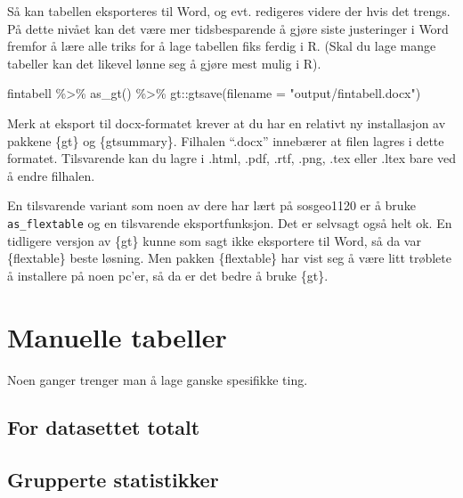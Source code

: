 \documentclass[
  letterpaper,
  DIV=11,
  numbers=noendperiod]{scrreprt}
\newenvironment{Shaded}{\begin{snugshade}}{\end{snugshade}}
\newcommand{\AttributeTok}[1]{\textcolor[rgb]{0.40,0.45,0.13}{#1}}
\newcommand{\FunctionTok}[1]{\textcolor[rgb]{0.28,0.35,0.67}{#1}}
\newcommand{\NormalTok}[1]{\textcolor[rgb]{0.00,0.23,0.31}{#1}}
\newcommand{\SpecialCharTok}[1]{\textcolor[rgb]{0.37,0.37,0.37}{#1}}
\newcommand{\StringTok}[1]{\textcolor[rgb]{0.13,0.47,0.30}{#1}}
\theoremstyle{definition}
\theoremstyle{remark}
\begin{document}
Så kan tabellen eksporteres til Word, og evt. redigeres videre der hvis
det trengs. På dette nivået kan det være mer tidsbesparende å gjøre
siste justeringer i Word fremfor å lære alle triks for å lage tabellen
fiks ferdig i R. (Skal du lage mange tabeller kan det likevel lønne seg
å gjøre mest mulig i R).

\begin{Shaded}
\begin{Highlighting}[]
\NormalTok{fintabell }\SpecialCharTok{\%\textgreater{}\%} 
  \FunctionTok{as\_gt}\NormalTok{() }\SpecialCharTok{\%\textgreater{}\%} 
\NormalTok{  gt}\SpecialCharTok{::}\FunctionTok{gtsave}\NormalTok{(}\AttributeTok{filename =} \StringTok{"output/fintabell.docx"}\NormalTok{)}
\end{Highlighting}
\end{Shaded}

Merk at eksport til docx-formatet krever at du har en relativt ny
installasjon av pakkene \{gt\} og \{gtsummary\}. Filhalen ``.docx''
innebærer at filen lagres i dette formatet. Tilsvarende kan du lagre i
.html, .pdf, .rtf, .png, .tex eller .ltex bare ved å endre filhalen.

En tilsvarende variant som noen av dere har lært på sosgeo1120 er å
bruke \texttt{as\_flextable} og en tilsvarende eksportfunksjon. Det er
selvsagt også helt ok. En tidligere versjon av \{gt\} kunne som sagt
ikke eksportere til Word, så da var \{flextable\} beste løsning. Men
pakken \{flextable\} har vist seg å være litt trøblete å installere på
noen pc'er, så da er det bedre å bruke \{gt\}.

\hypertarget{manuelle-tabeller}{%
\section{Manuelle tabeller}\label{manuelle-tabeller}}

Noen ganger trenger man å lage ganske spesifikke ting.

\hypertarget{for-datasettet-totalt}{%
\subsection{For datasettet totalt}\label{for-datasettet-totalt}}

\hypertarget{grupperte-statistikker}{%
\subsection{Grupperte statistikker}\label{grupperte-statistikker}}
\end{document}

